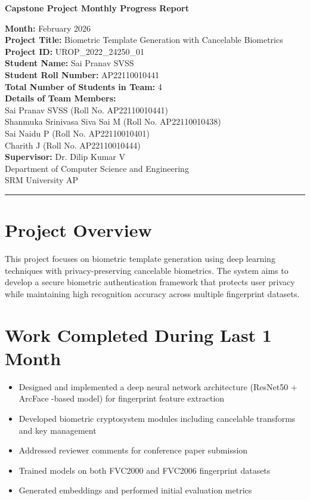 \documentclass[12pt,a4paper]{article}
\begin{document}
\begin{center}
    \Large \textbf{Capstone Project Monthly Progress Report}\\[0.5cm]
    \normalsize
    
    \textbf{Month:} February 2026 \\[0.5cm]
    \textbf{Project Title:} Biometric Template Generation with Cancelable Biometrics \\[0.5cm]
    \textbf{Project ID:} UROP\_2022\_24250\_01\\[0.5cm]
    \textbf{Student Name:} Sai Pranav SVSS \\
    \textbf{Student Roll Number:} AP22110010441\\

    \textbf{Total Number of Students in Team:} 4 \\[0.3cm]
    \textbf{Details of Team Members:}\\
    Sai Pranav SVSS  (Roll No. AP22110010441)\\
    Shanmuka Srinivasa Siva Sai M (Roll No. AP22110010438)\\
    Sai Naidu P (Roll No. AP22110010401)\\
    Charith J (Roll No. AP22110010444)\\[0.2cm]
    \textbf{Supervisor:} Dr. Dilip Kumar V \\[0.5cm]
    Department of Computer Science and Engineering\\
    SRM University AP
\end{center}

\hrule
\vspace{1cm}

\section{Project Overview}
This project focuses on biometric template generation using deep learning techniques with privacy-preserving cancelable biometrics. The system aims to develop a secure biometric authentication framework that protects user privacy while maintaining high recognition accuracy across multiple fingerprint datasets.

\section{Work Completed During Last 1 Month}
\begin{itemize}[leftmargin=*]
    \item Designed and implemented a deep neural network architecture (ResNet50 + ArcFace -based model) for fingerprint feature extraction
    \item Developed biometric cryptosystem modules including cancelable transforms and key management
    \item Addressed reviewer comments for conference paper submission
    \item Trained models on both FVC2000 and FVC2006 fingerprint datasets
    \item Generated embeddings and performed initial evaluation metrics
\end{itemize}
\end{document}
